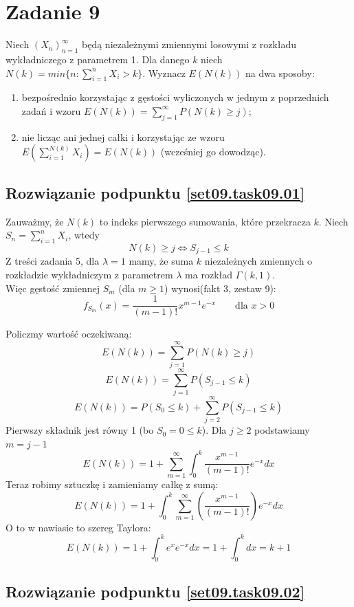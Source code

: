 \section{Zadanie 9}
Niech \((X_n)^{\infty}_{n=1}\) będą niezależnymi zmiennymi losowymi z rozkładu wykładniczego z parametrem 1.
Dla danego \(k\) niech \(N(k) = min\{ n : \sum_{i=1}^{n} X_i > k\}\).
Wyznacz \(E(N(k))\) na dwa sposoby:
\begin{enumerate}[label=(\roman*)]
	\item\label{set09.task09.01} bezpośrednio korzystając z gęstości wyliczonych w jednym z poprzednich zadań
	      i wzoru \(E(N(k)) = \sum_{j=1}^{\infty} P(N(k) \geq j)\);
	\item\label{set09.task09.02} nie licząc ani jednej całki
	      i korzystając ze wzoru \(E(\sum_{i=1}^{N(k)}X_i) = E(N(k))\) (wcześniej go dowodząc).
\end{enumerate}

\subsection*{Rozwiązanie podpunktu \ref{set09.task09.01}}
Zauważmy, że \(N(k)\) to indeks pierwszego sumowania, które przekracza \(k\).
Niech \(S_n = \sum_{i=1}^{n} X_i\), wtedy
\[
	N(k) \geq j \Leftrightarrow S_{j-1} \leq k
\]
Z treści zadania 5, dla \(\lambda = 1\) mamy, że suma \(k\) niezależnych zmiennych o rozkładzie wykładniczym z parametrem \(\lambda\)
ma rozkład \(\Gamma(k, 1)\). \\
Więc gęstość zmiennej \(S_m\) (dla \(m \geq 1\)) wynosi(fakt 3, zestaw 9):
\[
	f_{S_m}(x) = \frac{1}{(m-1)!} x ^ {m-1} e^{-x}  \qquad \text{dla } x > 0
\]

Policzmy wartość oczekiwaną:
\[    E(N(k)) = \sum_{j=1}^{\infty} P(N(k) \geq j)\]
\[    E(N(k)) = \sum_{j=1}^{\infty} P(S_{j-1} \leq k)\]
\[    E(N(k)) = P(S_0 \leq k) + \sum_{j=2}^{\infty} P(S_{j-1} \leq k)\]
Pierwszy składnik jest równy 1 (bo \(S_0 = 0 \leq k\)). Dla \(j \geq 2\) podstawiamy \(m = j-1\)
\[    E(N(k)) = 1 + \sum_{m=1}^{\infty} \int_{0}^{k} \frac{x^{m-1}}{(m-1)!} e^{-x} dx \]
Teraz robimy sztuczkę i zamieniamy całkę z sumą:
\[    E(N(k)) = 1 + \int_{0}^{k} \sum_{m=1}^{\infty} \left( \frac{x^{m-1}}{(m-1)!} \right) e^{-x} dx \]
O to w nawiasie to szereg Taylora:
\[    E(N(k)) = 1 + \int_{0}^{k} e^x e^{-x} dx = 1 + \int_{0}^{k}dx = k + 1 \]

\subsection*{Rozwiązanie podpunktu \ref{set09.task09.02}}
